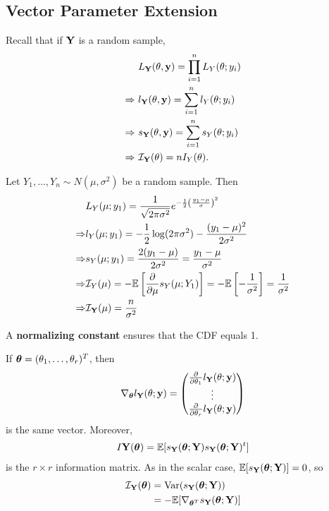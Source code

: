 
\subsection{Vector Parameter Extension}
Recall that if $\mathbf Y$ is a random sample, 
\begin{align*}
    &L_\mathbf Y(\theta, \mathbf y)=\prod^n_{i=1} L_Y(\theta; y_i) \\
    \Rightarrow \ &l_\mathbf Y(\theta,\mathbf y)=\sum^n_{i=1}l_Y(\theta;y_i) \\
    \Rightarrow \ &s_\mathbf Y(\theta,\mathbf y)=\sum^n_{i=1}s_Y(\theta;y_i) \\
    \Rightarrow \ &\mathcal I_\mathbf Y(\theta)=nI_Y(\theta).
\end{align*}

\begin{eg}
Let $Y_1,\dots,Y_n\sim N(\mu,\sigma^2)$ be a random sample. Then
\begin{align*}
    &L_Y(\mu;y_1)=\frac{1}{\sqrt{2\pi\sigma^2}}e^{-\frac{1}{2}\left(\frac{y_1-\mu}{\sigma}\right)^2} \\
    \Rightarrow &l_Y(\mu;y_1)=-\frac{1}{2}\log(2\pi\sigma^2)-\frac{(y_1-\mu)^2}{2\sigma^2} \\
    \Rightarrow &s_Y(\mu;y_1)=\frac{2(y_1-\mu)}{2\sigma^2}=\frac{y_1-\mu}{\sigma^2} \\
    \Rightarrow &\mathcal I_Y(\mu)=-\mathbb E\left[\frac{\partial}{\partial\mu}s_Y(\mu;Y_1)\right]=-\mathbb E\left[-\frac{1}{\sigma^2}\right]=\frac{1}{\sigma^2} \\
    \Rightarrow &\mathcal I_\mathbf Y(\mu)=\frac{n}{\sigma^2}
\end{align*}
\end{eg}

\begin{definition}
A \textbf{normalizing constant} ensures that the CDF equals 1.
\end{definition} 

If ${\boldsymbol{\theta}}=(\theta_1,\dots,\theta_r)^T$, then
\begin{align*}
    \nabla_{{\boldsymbol{\theta}}}l_\mathbf Y(\theta;\mathbf y)=
    \begin{pmatrix}
    \frac{\partial}{\partial\theta_1}l_\mathbf Y(\theta;\mathbf y) \\ \vdots \\ \frac{\partial}{\partial\theta_r}l_\mathbf Y(\theta;\mathbf y)
    \end{pmatrix}
\end{align*}
is the same vector. Moreover,
\begin{align*}
    I\mathbf Y({\boldsymbol{\theta}})=\mathbb E[s_\mathbf Y({\boldsymbol{\theta}};\mathbf Y)s_\mathbf Y({\boldsymbol{\theta}};\mathbf Y)^t] 
\end{align*}
is the $r\times r$ information matrix. As in the scalar case, $\mathbb E[s_\mathbf Y({\boldsymbol{\theta}};\mathbf Y)]=0$, so
\begin{align*}
    \mathcal I_\mathbf Y({\boldsymbol{\theta}})&=\operatorname*{Var}(s_\mathbf Y({\boldsymbol{\theta}}; \mathbf Y)) \\
    &=-\mathbb E[\nabla_{{\boldsymbol{\theta}}^T}s_\mathbf Y({\boldsymbol{\theta}};\mathbf Y)]
\end{align*}

